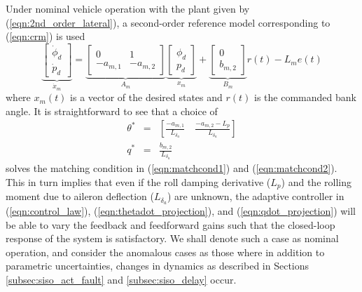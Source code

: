Under nominal vehicle operation with the plant given by (\ref{eqn:2nd_order_lateral}), a second-order reference model corresponding to (\ref{eqn:crm}) is used
\begin{equation}
	\underbrace{\begin{bmatrix}
		\dot{\phi}_d \\ \dot{p}_d
	\end{bmatrix}}_{\dot{x}_m} = \underbrace{\begin{bmatrix}
		0 & 1\\ -a_{m,1} & -a_{m,2}
	\end{bmatrix}}_{A_m} \underbrace{\begin{bmatrix}
		\phi_d \\ p_d
	\end{bmatrix}}_{x_m} + \underbrace{\begin{bmatrix}
		0 \\ b_{m,2}
	\end{bmatrix}}_{B_m} r(t) - L_m e(t)
	\label{eqn:rm_2_symbolic}
\end{equation}
\noindent where $x_m(t)$ is a vector of the desired states and $r(t)$ is the commanded bank angle. It is straightforward to see that a choice of
\begin{eqnarray}
	\theta^* &=& \left[ \frac{-a_{m,1}}{L_{\delta_a}} \quad \frac{-a_{m,2}-L_p}{L_{\delta_a}} \right] \label{e:tstar}\\
	q^* &=& \frac{b_{m,2}}{L_{\delta_a}} \label{e:qstar}
\end{eqnarray} 
\noindent solves the matching condition in (\ref{eqn:matchcond1}) and (\ref{eqn:matchcond2}). This in turn implies that even if the roll damping derivative ($L_p$) and the rolling moment due to aileron deflection ($L_{\delta_a}$) are unknown, the adaptive controller in (\ref{eqn:control_law}), (\ref{eqn:thetadot_projection}), and (\ref{eqn:qdot_projection}) will be able to vary the feedback and feedforward gains such that the closed-loop response of the system is satisfactory. We shall denote such a case as nominal operation, and consider the anomalous cases as those where in addition to parametric uncertainties, changes in dynamics as described in Sections \ref{subsec:siso_act_fault} and \ref{subsec:siso_delay} occur.


